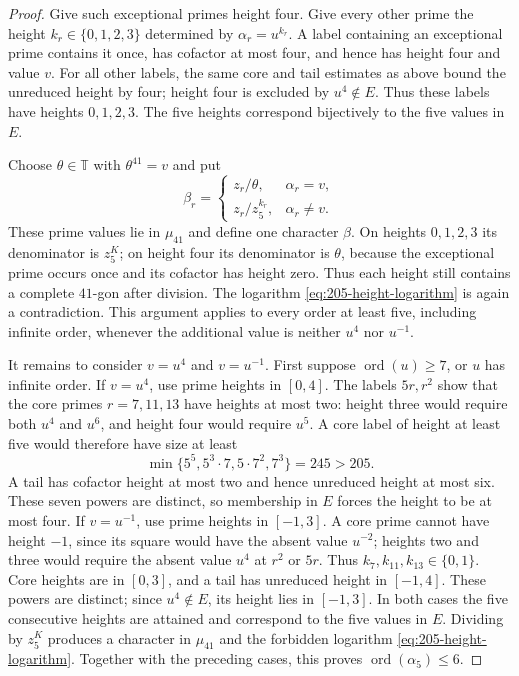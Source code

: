 \documentclass[10pt,a4paper]{amsart}
\newcommand{\T}{\mathbb T}
\begin{document}
\begin{proof}
Give such exceptional primes height four. Give every other prime
the height $k_r\in\{0,1,2,3\}$ determined by $\alpha_r=u^{k_r}$.
A label containing an exceptional prime contains it once, has cofactor
at most four, and hence has height four and value $v$.
For all other labels, the same core and tail estimates as above bound
the unreduced height by four; height four is excluded by $u^4\notin E$.
Thus these labels have heights $0,1,2,3$. The five heights correspond
bijectively to the five values in $E$.

Choose $\theta\in\T$ with $\theta^{41}=v$ and put
\[
 \beta_r=
 \begin{cases}
 z_r/\theta,&\alpha_r=v,\\
 z_r/z_5^{k_r},&\alpha_r\ne v.
 \end{cases}
\]
These prime values lie in $\mu_{41}$ and define one character
$\beta$. On heights $0,1,2,3$ its denominator is $z_5^K$; on height
four its denominator is $\theta$, because the exceptional prime occurs
once and its cofactor has height zero. Thus each height still contains
a complete $41$-gon after division. The logarithm
\eqref{eq:205-height-logarithm} is again a contradiction.
This argument applies to every order at least five, including infinite
order, whenever the additional value is neither $u^4$ nor $u^{-1}$.

It remains to consider $v=u^4$ and $v=u^{-1}$. First suppose
$\operatorname{ord}(u)\ge7$, or $u$ has infinite order.
If $v=u^4$, use prime heights in $[0,4]$.
The labels $5r,r^2$ show that the core primes $r=7,11,13$ have
heights at most two: height three would require both $u^4$ and $u^6$,
and height four would require $u^5$. A core label of height at least
five would therefore have size at least
\[
 \min\{5^5,5^3\cdot7,5\cdot7^2,7^3\}=245>205.
\]
A tail has cofactor height at most two and hence unreduced height at
most six. These seven powers are distinct, so membership in $E$ forces
the height to be at most four.
If $v=u^{-1}$, use prime heights in $[-1,3]$. A core prime cannot
have height $-1$, since its square would have the absent value $u^{-2}$;
heights two and three would require the absent value $u^4$ at $r^2$
or $5r$. Thus $k_7,k_{11},k_{13}\in\{0,1\}$.
Core heights are in $[0,3]$, and a tail has unreduced height in
$[-1,4]$. These powers are distinct; since $u^4\notin E$, its height
lies in $[-1,3]$. In both cases the five consecutive heights
are attained and correspond to the five values in $E$. Dividing by $z_5^K$
produces a character in $\mu_{41}$ and the forbidden logarithm
\eqref{eq:205-height-logarithm}. Together with the preceding cases,
this proves $\operatorname{ord}(\alpha_5)\le6$.


\end{proof}
\end{document}
